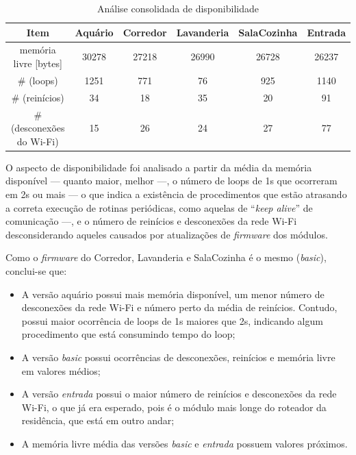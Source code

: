 \begin{table}[H]
    \caption{Análise consolidada de disponibilidade}
    \setlength\tabcolsep{1.5pt}
    \centering
    \footnotesize
    \begin{tabular}{cccccc}
        \textbf{Item} & \textbf{Aquário} & \textbf{Corredor} & \textbf{Lavanderia} & \textbf{SalaCozinha} & \textbf{Entrada} \\
        \midrule
        memória livre [bytes] &
        30278 &
        27218 &
        26990 &
        26728 &
        26237 \\
        \# (loops) &
        1251 &
        771 &
        76 &
        925 &
        1140 \\
        \# (reinícios) &
        34 &
        18 &
        35 &
        20 &
        91 \\
        \# (desconexões do Wi-Fi) &
        15 &
        26 &
        24 &
        27 &
        77 \\
    \end{tabular}
\end{table}

O aspecto de disponibilidade foi analisado a partir da média da memória disponível --- quanto maior, melhor ---, o número de loops de 1s que ocorreram em 2s ou mais --- o que indica a existência de procedimentos que estão atrasando a correta execução de rotinas periódicas, como aquelas de “\emph{keep alive}” de comunicação ---, e o número de reinícios e desconexões da rede Wi-Fi desconsiderando aqueles causados por atualizações de \emph{firmware} dos módulos.

Como o \emph{firmware} do Corredor, Lavanderia e SalaCozinha é o mesmo (\emph{basic}), conclui-se que:

\begin{itemize}
	\item A versão aquário possui mais memória disponível, um menor número de desconexões da rede Wi-Fi e número perto da média de reinícios. Contudo, possui maior ocorrência de loops de 1s maiores que 2s, indicando algum procedimento que está consumindo tempo do loop;
	\item A versão \emph{basic} possui ocorrências de desconexões, reinícios e memória livre em valores médios;
	\item A versão \emph{entrada} possui o maior número de reinícios e desconexões da rede Wi-Fi, o que já era esperado, pois é o módulo mais longe do roteador da residência, que está em outro andar;
	\item A memória livre média das versões \emph{basic} e \emph{entrada} possuem valores próximos.
\end{itemize}

